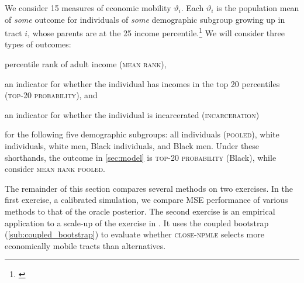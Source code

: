 \documentclass[12pt, reqno]{amsart}
\newcommand{\meanrank}{\textsc{mean rank}}
\newcommand{\topprob}{\textsc{top-{\small 20} probability}}
\newcommand{\incarceration}{\textsc{incarceration}}
\newcommand{\pooled}{\textsc{pooled}}
\newcommand{\close}{\textsc{close}}
\newcommand{\npmle}{\textsc{npmle}}
\newcommand{\closenpmle}{\close-\npmle}
\numberwithin{equation}{section}
\begin{document}
We consider 15 measures of economic mobility $\vartheta_i$. Each $\vartheta_i$ is the
population mean of \emph{some} outcome for individuals of \emph{some} demographic
subgroup growing up in tract $i$, whose parents are at the 25\th{} income
percentile.\footnote{\label{fn:alpha}} We will
consider three types of outcomes:
\begin{enumerate*}[label=(\roman*)]
  \item percentile rank of adult income (\meanrank),
  \item an indicator for whether the individual has incomes in the top 20
  percentiles (\topprob), and
  \item an indicator for whether the individual is incarcerated (\incarceration)
\end{enumerate*}
for the following five demographic subgroups: all individuals (\pooled), white
individuals, white men, Black individuals, and Black men. Under these shorthands, the
outcome in \cref{sec:model} is
\topprob{} (Black), while \citet{bergman2019creating} consider \meanrank{}
\pooled. 


The remainder of this section compares several methods on two exercises. In the first
exercise, a calibrated simulation, we compare MSE performance of various methods to
that of the oracle posterior. The second exercise is an empirical application to a
scale-up of the exercise in \citet{bergman2019creating}. It uses the coupled bootstrap
(\cref{sub:coupled_bootstrap}) to evaluate whether
\closenpmle{} selects more economically mobile tracts than alternatives.
\end{document}
